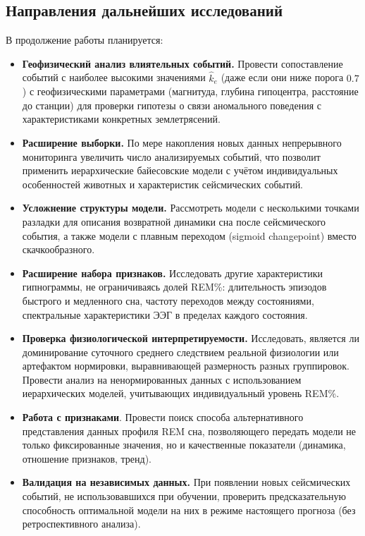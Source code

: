 \documentclass[14pt]{mmcs_article}
\begin{document}
\subsection*{Направления дальнейших исследований}

В продолжение работы планируется:

\begin{itemize}
	\item \textbf{Геофизический анализ влиятельных событий.}
	Провести сопоставление событий с наиболее
	высокими значениями $\hat{k}_e$ (даже если они
	ниже порога $0.7$) с геофизическими параметрами
	(магнитуда, глубина гипоцентра, расстояние до
	станции) для проверки гипотезы о связи
	аномального поведения с характеристиками
	конкретных землетрясений.
	
	\item \textbf{Расширение выборки.}
	По мере накопления новых данных непрерывного
	мониторинга увеличить число анализируемых
	событий, что позволит применить иерархические
	байесовские модели с учётом индивидуальных
	особенностей животных и характеристик
	сейсмических событий.
	
	\item \textbf{Усложнение структуры модели.}
	Рассмотреть модели с несколькими точками
	разладки для описания возвратной динамики сна
	после сейсмического события, а также модели с
	плавным переходом (sigmoid changepoint) вместо
	скачкообразного.
	
	\item \textbf{Расширение набора признаков.}
	Исследовать другие характеристики
	гипнограммы, не ограничиваясь долей REM\%:
	длительность эпизодов быстрого и медленного
	сна, частоту переходов между состояниями,
	спектральные характеристики ЭЭГ в пределах
	каждого состояния.
	
	\item \textbf{Проверка физиологической
		интерпретируемости.}
	Исследовать, является ли доминирование
	суточного среднего следствием реальной
	физиологии или артефактом нормировки,
	выравнивающей размерность разных группировок.
	Провести анализ на ненормированных данных с
	использованием иерархических моделей,
	учитывающих индивидуальный уровень REM\%.
	
	\item \textbf{Работа с признаками}. Провести поиск способа альтернативного представления данных профиля REM сна, позволяющего передать модели не только фиксированные значения, но и качественные показатели (динамика, отношение признаков, тренд).
	
	\item \textbf{Валидация на независимых данных.}
	При появлении новых сейсмических событий,
	не использовавшихся при обучении, проверить
	предсказательную способность оптимальной модели
	на них в режиме настоящего прогноза (без
	ретроспективного анализа).
\end{itemize}
\newpage
\end{document}
